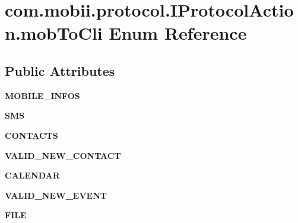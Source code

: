 \hypertarget{enumcom_1_1mobii_1_1protocol_1_1_i_protocol_action_1_1mob_to_cli}{\section{com.\-mobii.\-protocol.\-I\-Protocol\-Action.\-mob\-To\-Cli Enum Reference}
\label{enumcom_1_1mobii_1_1protocol_1_1_i_protocol_action_1_1mob_to_cli}
}
\subsection*{Public Attributes}
\begin{DoxyCompactItemize}
\item 
\hypertarget{enumcom_1_1mobii_1_1protocol_1_1_i_protocol_action_1_1mob_to_cli_ada0f9a628dbc92bba1a681657dba95bb}{{\bfseries M\-O\-B\-I\-L\-E\-\_\-\-I\-N\-F\-O\-S}}\label{enumcom_1_1mobii_1_1protocol_1_1_i_protocol_action_1_1mob_to_cli_ada0f9a628dbc92bba1a681657dba95bb}

\item 
\hypertarget{enumcom_1_1mobii_1_1protocol_1_1_i_protocol_action_1_1mob_to_cli_a78e2b1a914d9e48ab33cc8bbb9759daf}{{\bfseries S\-M\-S}}\label{enumcom_1_1mobii_1_1protocol_1_1_i_protocol_action_1_1mob_to_cli_a78e2b1a914d9e48ab33cc8bbb9759daf}

\item 
\hypertarget{enumcom_1_1mobii_1_1protocol_1_1_i_protocol_action_1_1mob_to_cli_a493e41667700c77ff4767f5c631c423a}{{\bfseries C\-O\-N\-T\-A\-C\-T\-S}}\label{enumcom_1_1mobii_1_1protocol_1_1_i_protocol_action_1_1mob_to_cli_a493e41667700c77ff4767f5c631c423a}

\item 
\hypertarget{enumcom_1_1mobii_1_1protocol_1_1_i_protocol_action_1_1mob_to_cli_a036f629d30598b0ab9a6a68d8207a384}{{\bfseries V\-A\-L\-I\-D\-\_\-\-N\-E\-W\-\_\-\-C\-O\-N\-T\-A\-C\-T}}\label{enumcom_1_1mobii_1_1protocol_1_1_i_protocol_action_1_1mob_to_cli_a036f629d30598b0ab9a6a68d8207a384}

\item 
\hypertarget{enumcom_1_1mobii_1_1protocol_1_1_i_protocol_action_1_1mob_to_cli_a27b55376a6e0e45406d3cb6897270418}{{\bfseries C\-A\-L\-E\-N\-D\-A\-R}}\label{enumcom_1_1mobii_1_1protocol_1_1_i_protocol_action_1_1mob_to_cli_a27b55376a6e0e45406d3cb6897270418}

\item 
\hypertarget{enumcom_1_1mobii_1_1protocol_1_1_i_protocol_action_1_1mob_to_cli_a561bf39601e5fd659cb1e642cc27a45c}{{\bfseries V\-A\-L\-I\-D\-\_\-\-N\-E\-W\-\_\-\-E\-V\-E\-N\-T}}\label{enumcom_1_1mobii_1_1protocol_1_1_i_protocol_action_1_1mob_to_cli_a561bf39601e5fd659cb1e642cc27a45c}

\item 
\hypertarget{enumcom_1_1mobii_1_1protocol_1_1_i_protocol_action_1_1mob_to_cli_ad1d747003bcde602d8debee8c50793da}{{\bfseries F\-I\-L\-E}}\label{enumcom_1_1mobii_1_1protocol_1_1_i_protocol_action_1_1mob_to_cli_ad1d747003bcde602d8debee8c50793da}

\end{DoxyCompactItemize}


